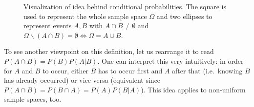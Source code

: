 \begin{figure}[t]
\centering



\def\A{(-1,0) ellipse [rotate=30, x radius=1, y radius=2]}
\def\B{(1,0) ellipse [rotate=-30, x radius=1, y radius=2]}
\def\O{(-3,-3) rectangle (3,3)}






\caption{Visualization of idea behind conditional probabilities. The square is used to represent the whole sample space $\Omega$ and two ellipses to represent events $A, B$ with $A \cap B \neq \emptyset$ and $\Omega\backslash (A \cap B) = \emptyset \Leftrightarrow \Omega = A \cup B$.}%
\label{fig:cond_prob}
\end{figure}



To see another viewpoint on this definition, let us rearrange it to read $P(A \cap B) = P(B) P(A | B)$. One can interpret this very intuitively: in order for $A$ and $B$ to occur, either $B$ has to occur first and $A$ after that (i.e.~knowing $B$ has already occurred) or vice versa (equivalent since $P(A \cap B) = P(B \cap A) = P(A) P(B | A)$). This idea applies to non-uniform sample spaces, too.



